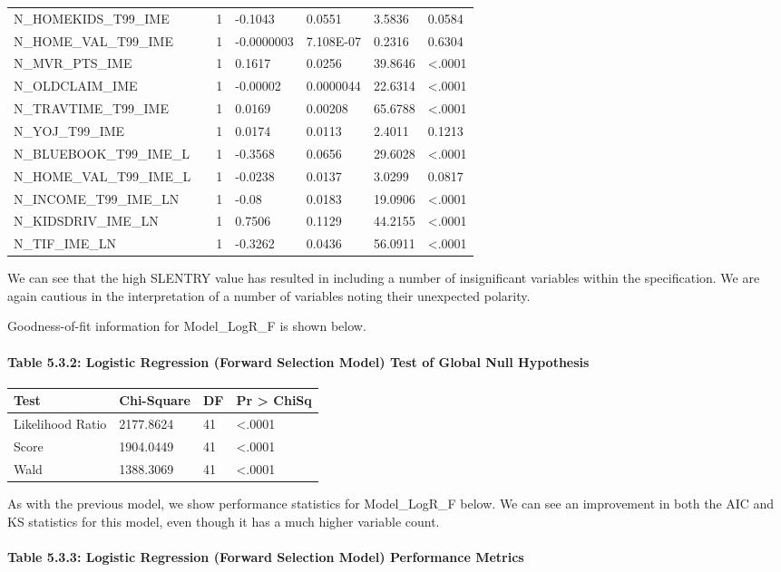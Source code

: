 \documentclass[]{article}
\let\oldparagraph\paragraph
\renewcommand{\paragraph}[1]{\oldparagraph{#1}\mbox{}}
\begin{document}
\begin{longtable}[]{@{}lllllll@{}}
N\_HOMEKIDS\_T99\_IME & & 1 & -0.1043 & 0.0551 & 3.5836 &
0.0584\tabularnewline
N\_HOME\_VAL\_T99\_IME & & 1 & -0.0000003 & 7.108E-07 & 0.2316 &
0.6304\tabularnewline
N\_MVR\_PTS\_IME & & 1 & 0.1617 & 0.0256 & 39.8646 &
\textless{}.0001\tabularnewline
N\_OLDCLAIM\_IME & & 1 & -0.00002 & 0.0000044 & 22.6314 &
\textless{}.0001\tabularnewline
N\_TRAVTIME\_T99\_IME & & 1 & 0.0169 & 0.00208 & 65.6788 &
\textless{}.0001\tabularnewline
N\_YOJ\_T99\_IME & & 1 & 0.0174 & 0.0113 & 2.4011 &
0.1213\tabularnewline
N\_BLUEBOOK\_T99\_IME\_L & & 1 & -0.3568 & 0.0656 & 29.6028 &
\textless{}.0001\tabularnewline
N\_HOME\_VAL\_T99\_IME\_L & & 1 & -0.0238 & 0.0137 & 3.0299 &
0.0817\tabularnewline
N\_INCOME\_T99\_IME\_LN & & 1 & -0.08 & 0.0183 & 19.0906 &
\textless{}.0001\tabularnewline
N\_KIDSDRIV\_IME\_LN & & 1 & 0.7506 & 0.1129 & 44.2155 &
\textless{}.0001\tabularnewline
N\_TIF\_IME\_LN & & 1 & -0.3262 & 0.0436 & 56.0911 &
\textless{}.0001\tabularnewline
\bottomrule
\end{longtable}

We can see that the high SLENTRY value has resulted in including a
number of insignificant variables within the specification. We are again
cautious in the interpretation of a number of variables noting their
unexpected polarity.

Goodness-of-fit information for Model\_LogR\_F is shown below.

\paragraph{Table 5.3.2: Logistic Regression (Forward Selection Model)
Test of Global Null
Hypothesis}\label{table-5.3.2-logistic-regression-forward-selection-model-test-of-global-null-hypothesis}

\begin{longtable}[]{@{}llll@{}}
\toprule
Test & Chi-Square & DF & Pr \textgreater{} ChiSq\tabularnewline
\midrule
\endhead
Likelihood Ratio & 2177.8624 & 41 & \textless{}.0001\tabularnewline
Score & 1904.0449 & 41 & \textless{}.0001\tabularnewline
Wald & 1388.3069 & 41 & \textless{}.0001\tabularnewline
\bottomrule
\end{longtable}

As with the previous model, we show performance statistics for
Model\_LogR\_F below. We can see an improvement in both the AIC and KS
statistics for this model, even though it has a much higher variable
count.

\paragraph{Table 5.3.3: Logistic Regression (Forward Selection Model)
Performance
Metrics}\label{table-5.3.3-logistic-regression-forward-selection-model-performance-metrics}
\end{document}
